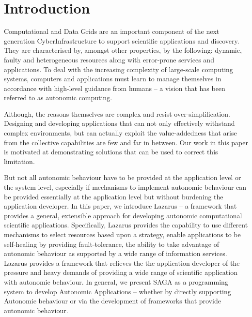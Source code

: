 \documentclass[conference,final]{IEEEtran}
\begin{document}
\section{Introduction}

Computational and Data Grids are an important component of the next
generation CyberInfrastructure to support scientific applications and
discovery.  They are characterised by, amongst other properties, by
the following: dynamic, faulty and heterogeneous resources along with
error-prone services and applications.  To deal with the increasing
complexity of large-scale computing systems, computers and
applications must learn to manage themselves in accordance with
high-level guidance from humans -- a vision that has been referred to
as autonomic computing.

Although, the reasons themselves are complex and resist
over-simplification.  Designing and developing applications that can
not only effectively withstand complex environments, but can actually
exploit the value-addedness that arise from the collective
capabilities are few and far in between.  Our work in this paper is
motivated at demonstrating solutions that can be used to correct this
limitation.

But not all autonomic behaviour have to be provided at the application
level or the system level, especially if mechanisms to implement
autonomic behaviour can be provided essentially at the application
level but without burdening the application developer.  In this paper,
we introduce Lazarus -- a framework that provides a general,
extensible approach for developing autonomic computational scientific
applications. Specifically, Lazarus provides the capability to use
different mechanisms to select resources based upon a strategy, enable
applications to be self-healing by providing fault-tolerance, the
ability to take advantage of autonomic behaviour as supported by a
wide range of information services. Lazarus provides a framework that
relieves the the application developer of the pressure and heavy
demands of providing a wide range of scientific application with
autonomic behaviour.  In general, we present SAGA as a programming
system to develop Autonomic Applications -- whether by directly
supporting Autonomic behaviour or via the development of frameworks
that provide autonomic behaviour.

\end{document}
